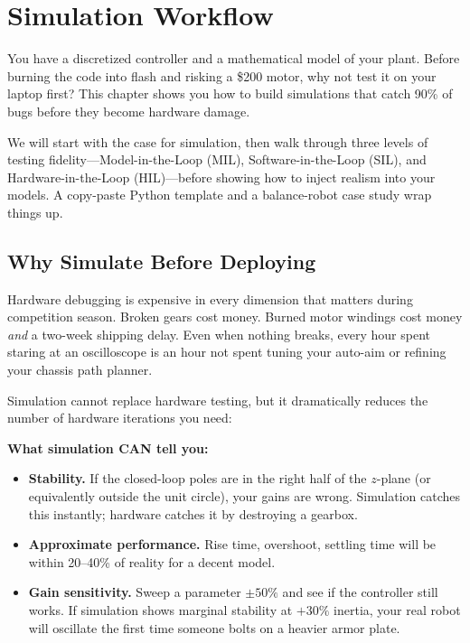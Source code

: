 \section{Simulation Workflow}

You have a discretized controller and a mathematical model of your plant.
Before burning the code into flash and risking a \$200 motor, why not test it
on your laptop first? This chapter shows you how to build simulations that
catch 90\% of bugs before they become hardware damage.

We will start with the case for simulation, then walk through three levels of
testing fidelity---Model-in-the-Loop (MIL), Software-in-the-Loop (SIL), and
Hardware-in-the-Loop (HIL)---before showing how to inject realism into your
models. A copy-paste Python template and a balance-robot case study wrap things
up.

\subsection{Why Simulate Before Deploying}

Hardware debugging is expensive in every dimension that matters during
competition season. Broken gears cost money. Burned motor windings cost
money \textit{and} a two-week shipping delay. Even when nothing breaks, every
hour spent staring at an oscilloscope is an hour not spent tuning your
auto-aim or refining your chassis path planner.

Simulation cannot replace hardware testing, but it dramatically reduces the
number of hardware iterations you need:

\textbf{What simulation CAN tell you:}
\begin{itemize}
    \item \textbf{Stability.} If the closed-loop poles are in the right half of
          the $z$-plane (or equivalently outside the unit circle), your gains
          are wrong. Simulation catches this instantly; hardware catches it by
          destroying a gearbox.
    \item \textbf{Approximate performance.} Rise time, overshoot, settling time
          will be within 20--40\% of reality for a decent model.
    \item \textbf{Gain sensitivity.} Sweep a parameter $\pm 50\%$ and see if
          the controller still works. If simulation shows marginal stability
          at $+30\%$ inertia, your real robot will oscillate the first time
          someone bolts on a heavier armor plate.
\end{itemize}

